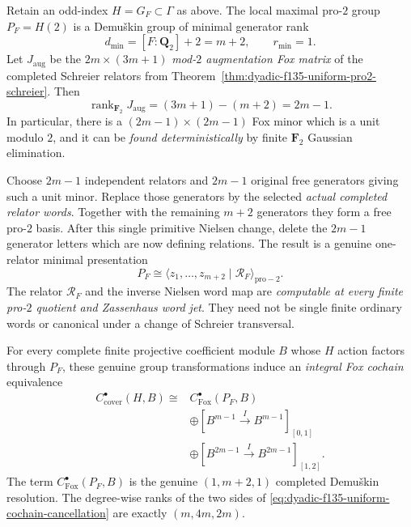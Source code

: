 \begin{theorem}
\label{thm:dyadic-f135-primitive-pivot-compiler}
Retain an odd-index
$H=G_F\subset\Gamma$
as above.
The local maximal
pro-$2$ group
$P_F=H(2)$ is
a Demu\v{s}kin group
of minimal generator
rank
\begin{equation}\label{eq:dyadic-f135-local-rank}
\boxed{\qquad
d_{\min}=[F:\mathbf Q_2]+2=m+2,
\qquad r_{\min}=1.
\qquad}
\end{equation}
Let $J_{\mathrm{aug}}$
be the $2m\times(3m+1)$
\emph{mod-$2$
augmentation Fox matrix}
of the completed
Schreier relators from
Theorem~\ref{thm:dyadic-f135-uniform-pro2-schreier}.
Then
\begin{equation}\label{eq:dyadic-f135-fox-augmentation-rank}
\boxed{\qquad
\operatorname{rank}_{\mathbf F_2}
J_{\mathrm{aug}}
=(3m+1)-(m+2)=2m-1.
\qquad}
\end{equation}
In particular,
there is a
$(2m-1)\times(2m-1)$
Fox minor which is
a unit modulo $2$,
and it can be
\emph{found
deterministically}
by finite
$\mathbf F_2$
Gaussian elimination.

Choose $2m-1$
independent relators
and $2m-1$
original free
generators giving
such a unit minor.
Replace those
generators by
the selected
\emph{actual
completed relator
words}.
Together with
the remaining
$m+2$ generators
they form a
free pro-$2$ basis.
After this single
primitive Nielsen
change, delete the
$2m-1$ generator
letters which are
now defining
relations.  The
result is a genuine
one-relator minimal
presentation
\begin{equation}\label{eq:dyadic-f135-general-minimal-relation}
\boxed{\quad
P_F\cong
\langle z_1,\ldots,z_{m+2}
\mid\mathscr R_F\rangle_{\mathrm{pro}-2}.
\quad}
\end{equation}
The relator
$\mathscr R_F$ and
the inverse Nielsen
word map are
\emph{computable
at every finite
pro-$2$ quotient
and Zassenhaus
word jet}.
They need not be
single finite
ordinary words
or canonical under
a change of
Schreier transversal.

For every complete
finite projective
coefficient module
$B$ whose
$H$ action
factors through
$P_F$, these
genuine group
transformations
induce an
\emph{integral
Fox cochain}
equivalence
\begin{equation}\label{eq:dyadic-f135-uniform-cochain-cancellation}
\boxed{
\begin{aligned}
C_{\mathrm{cover}}^\bullet(H,B)
\cong {}&
C_{\mathrm{Fox}}^\bullet(P_F,B)\\
&\oplus
[B^{m-1}\xrightarrow{I}B^{m-1}]_{[0,1]}\\
&\oplus
[B^{2m-1}\xrightarrow{I}B^{2m-1}]_{[1,2]} .
\end{aligned}}
\end{equation}
The term
$C_{\mathrm{Fox}}^\bullet(P_F,B)$
is the genuine
$(1,m+2,1)$
completed Demu\v{s}kin
resolution.
The degree-wise
ranks of the
two sides of
\eqref{eq:dyadic-f135-uniform-cochain-cancellation}
are exactly
$(m,4m,2m)$.


\end{theorem}
